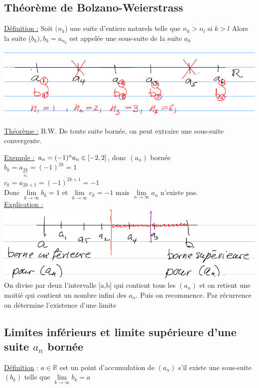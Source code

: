 \documentclass[12pt,a4paper]{article}
\newcommand{\limite}{\lim\limits_}
\newcommand{\ninf}{\ensuremath{n \to \infty}}
\newcommand{\R}{\ensuremath{\mathbb{R}} }
\newcommand{\Definition}{\underline{Définition} }
\begin{document}
{\subsection{Théorème de Bolzano-Weierstrass}
\begin{boite}
\underline{Définition :} Soit $(n_k$) une suite d'entiers naturels telle que $n_k > n_l$ si $k > l$ Alors la suite ($b_k), b_k = a_{n_k}$ est appelée une sous-suite de la suite $a_k$
\end{boite}
\includegraphics[scale=0.75]{illustrations_Analyse/b_w}
\begin{boite}
\underline{Théorème :} B.W. De toute suite bornée, on peut extraire une sous-suite convergente.
\end{boite}
\underline{Exemple :} $a_n = (-1)^n\\
a_n \in [-2,2]$, donc $(a_n)$ bornée\\
$b_k = a_{\underbrace{2k}_{n_k}} = (-1)^{2k} = 1$\\
$c_k = a_{2k+1} =(-1)^{2k+1} = -1$\\
Donc $\limite{k \to \infty} b_k = 1$ et $\limite{k\to \infty} c_k = -1$ mais $\limite{\ninf} a_n$ n'existe pas.\\
\underline{Explication :}\\
\includegraphics[scale=0.5]{illustrations_Analyse/expli}\\
On divise par deux l'intervalle [a,b] qui contient tous les $(a_n)$ et on retient une moitié qui contient un nombre infini des $a_n$. Puis on recommence. Par récurrence on détermine l'existence d'une limite
\subsection{Limites inférieurs et limite supérieure d'une suite $a_n$ bornée}
\begin{boite}
\Definition : $a\in \R$ est un point d'accumulation de $(a_n)$ s'il existe une sous-suite $(b_k)$ telle que $\limite{k \to \infty} b_k =a$
\end{boite}

}
\end{document}

